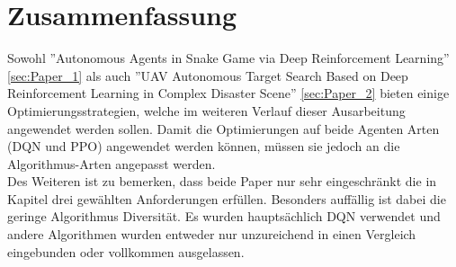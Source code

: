 \section{Zusammenfassung}
Sowohl ''Autonomous Agents in Snake Game via Deep Reinforcement Learning'' \ref{sec:Paper_1} als auch ''UAV Autonomous Target Search Based on Deep Reinforcement Learning in Complex Disaster Scene'' \ref{sec:Paper_2} bieten einige Optimierungsstrategien, welche im weiteren Verlauf dieser Ausarbeitung angewendet werden sollen. Damit die Optimierungen auf beide Agenten Arten (DQN und PPO) angewendet werden können, müssen sie jedoch an die Algorithmus-Arten angepasst werden.\\
Des Weiteren ist zu bemerken, dass beide Paper nur sehr eingeschränkt die in Kapitel drei gewählten Anforderungen erfüllen. Besonders auffällig ist dabei die geringe Algorithmus Diversität. Es wurden hauptsächlich DQN verwendet und andere Algorithmen wurden entweder nur unzureichend in einen Vergleich eingebunden oder vollkommen ausgelassen.
